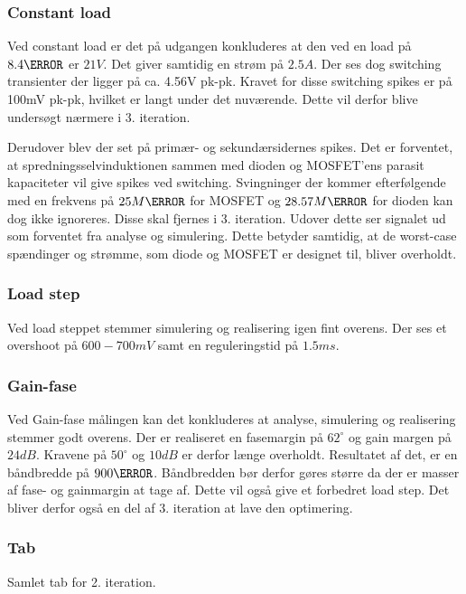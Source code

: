\subsubsection{Constant load}
Ved constant load er det på udgangen konkluderes at den ved en load på $8.4\ohm$ er $21V$. Det giver samtidig en strøm på $2.5A$. Der ses dog switching transienter der ligger på ca. 4.56V pk-pk. Kravet for disse switching spikes er på 100mV pk-pk, hvilket er langt under det nuværende. Dette vil derfor blive undersøgt nærmere i 3. iteration.


Derudover blev der set på primær- og sekundærsidernes spikes. Det er forventet, at spredningsselvinduktionen sammen med dioden og MOSFET'ens parasit kapaciteter vil give spikes ved switching. Svingninger der kommer efterfølgende med en frekvens på $25M\hertz$ for MOSFET og $28.57M\hertz$ for dioden kan dog ikke ignoreres. Disse skal fjernes i 3. iteration. Udover dette ser signalet ud som forventet fra analyse og simulering. Dette betyder samtidig, at de worst-case spændinger og strømme, som diode og MOSFET er designet til, bliver overholdt. 

\subsubsection{Load step}
Ved load steppet stemmer simulering og realisering igen fint overens. Der ses et overshoot på $600-700mV$ samt en reguleringstid på $1.5ms$.
 
\subsubsection{Gain-fase}
Ved Gain-fase målingen kan det konkluderes at analyse, simulering og realisering stemmer godt overens. Der er realiseret en fasemargin på $62^\circ$ og gain margen på $24dB.$ Kravene på $50^\circ$ og $10dB$ er derfor længe overholdt. Resultatet af det, er en båndbredde på $900\hertz$. Båndbredden bør derfor gøres større da der er masser af fase- og gainmargin at tage af. Dette vil også give et forbedret load step. Det bliver derfor også en del af 3. iteration at lave den optimering.   
\subsubsection{Tab}
Samlet tab for 2. iteration.